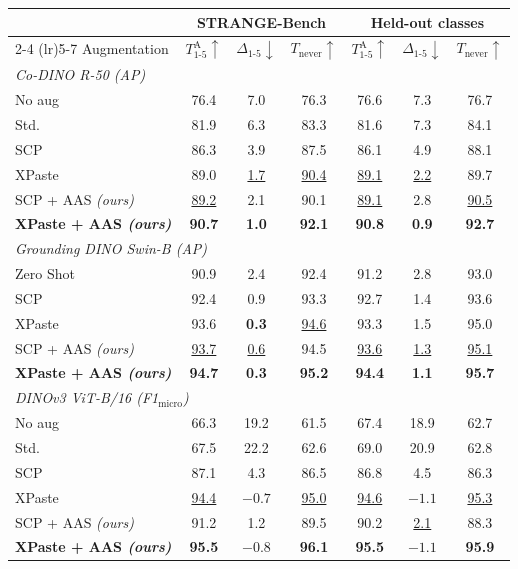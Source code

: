 \begin{tabular}{l ccc ccc}
\toprule
& \multicolumn{3}{c}{STRANGE-Bench} & \multicolumn{3}{c}{Held-out classes} \\
\cmidrule(lr){2-4} \cmidrule(lr){5-7}
Augmentation & $T_{1\text{-}5}^{\text{A}}\uparrow$ & $\Delta_{1\text{-}5}\downarrow$ & $T_{\text{never}}\uparrow$ & $T_{1\text{-}5}^{\text{A}}\uparrow$ & $\Delta_{1\text{-}5}\downarrow$ & $T_{\text{never}}\uparrow$ \\
\midrule
\multicolumn{7}{l}{\emph{Co-DINO R-50 (AP)}} \\
No aug & 76.4 & 7.0 & 76.3 & 76.6 & 7.3 & 76.7 \\
Std. & 81.9 & 6.3 & 83.3 & 81.6 & 7.3 & 84.1 \\
SCP & 86.3 & 3.9 & 87.5 & 86.1 & 4.9 & 88.1 \\
XPaste & 89.0 & \underline{1.7} & \underline{90.4} & \underline{89.1} & \underline{2.2} & 89.7 \\
\rowcolor{oursrow} SCP + AAS \emph{(ours)} & \underline{89.2} & 2.1 & 90.1 & \underline{89.1} & 2.8 & \underline{90.5} \\
\rowcolor{oursrow} \textbf{XPaste + AAS \emph{(ours)}} & \textbf{90.7} & \textbf{1.0} & \textbf{92.1} & \textbf{90.8} & \textbf{0.9} & \textbf{92.7} \\
\midrule
\multicolumn{7}{l}{\emph{Grounding DINO Swin-B (AP)}} \\
Zero Shot & 90.9 & 2.4 & 92.4 & 91.2 & 2.8 & 93.0 \\
SCP & 92.4 & 0.9 & 93.3 & 92.7 & 1.4 & 93.6 \\
XPaste & 93.6 & \textbf{0.3} & \underline{94.6} & 93.3 & 1.5 & 95.0 \\
\rowcolor{oursrow} SCP + AAS \emph{(ours)} & \underline{93.7} & \underline{0.6} & 94.5 & \underline{93.6} & \underline{1.3} & \underline{95.1} \\
\rowcolor{oursrow} \textbf{XPaste + AAS \emph{(ours)}} & \textbf{94.7} & \textbf{0.3} & \textbf{95.2} & \textbf{94.4} & \textbf{1.1} & \textbf{95.7} \\
\midrule
\multicolumn{7}{l}{\emph{DINOv3 ViT-B/16 (F1$_{\text{micro}}$)}} \\
No aug & 66.3 & 19.2 & 61.5 & 67.4 & 18.9 & 62.7 \\
Std. & 67.5 & 22.2 & 62.6 & 69.0 & 20.9 & 62.8 \\
SCP & 87.1 & 4.3 & 86.5 & 86.8 & 4.5 & 86.3 \\
XPaste & \underline{94.4} & \underline{$-0.7$} & \underline{95.0} & \underline{94.6} & \textbf{\boldmath $-1.1$} & \underline{95.3} \\
\rowcolor{oursrow} SCP + AAS \emph{(ours)} & 91.2 & 1.2 & 89.5 & 90.2 & \underline{2.1} & 88.3 \\
\rowcolor{oursrow} \textbf{XPaste + AAS \emph{(ours)}} & \textbf{95.5} & \textbf{\boldmath $-0.8$} & \textbf{96.1} & \textbf{95.5} & \textbf{\boldmath $-1.1$} & \textbf{95.9} \\
\bottomrule
\end{tabular}
